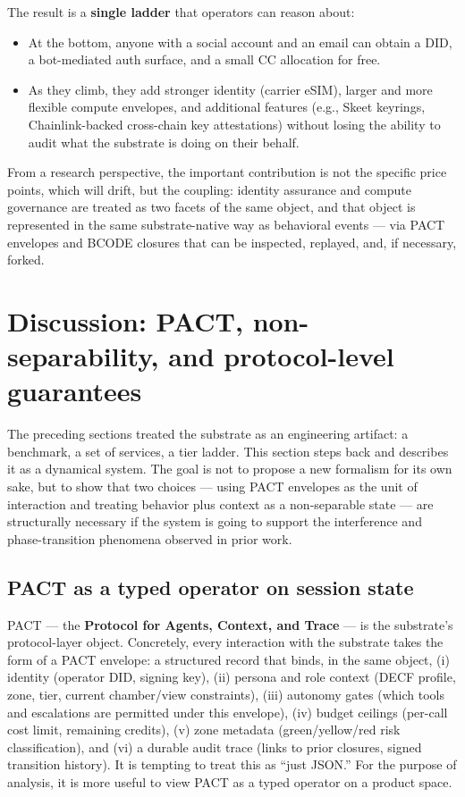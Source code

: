 \documentclass{article}
\providecommand{\tightlist}{\setlength{\itemsep}{0pt}\setlength{\parskip}{0pt}}
\begin{document}
The result is a \textbf{single ladder} that operators can reason about:

\begin{itemize}
\tightlist
\item
  At the bottom, anyone with a social account and an email can obtain a
  DID, a bot-mediated auth surface, and a small CC allocation for free.
\item
  As they climb, they add stronger identity (carrier eSIM), larger and
  more flexible compute envelopes, and additional features (e.g., Skeet
  keyrings, Chainlink-backed cross-chain key attestations) without
  losing the ability to audit what the substrate is doing on their
  behalf.
\end{itemize}

From a research perspective, the important contribution is not the
specific price points, which will drift, but the coupling: identity
assurance and compute governance are treated as two facets of the same
object, and that object is represented in the same substrate-native way
as behavioral events --- via PACT envelopes and BCODE closures that can
be inspected, replayed, and, if necessary, forked.

\section{Discussion: PACT, non-separability, and protocol-level
guarantees}\label{discussion-pact-non-separability-and-protocol-level-guarantees}

The preceding sections treated the substrate as an engineering artifact:
a benchmark, a set of services, a tier ladder. This section steps back
and describes it as a dynamical system. The goal is not to propose a new
formalism for its own sake, but to show that two choices --- using PACT
envelopes as the unit of interaction and treating behavior plus context
as a non-separable state --- are structurally necessary if the system is
going to support the interference and phase-transition phenomena
observed in prior work.

\subsection{PACT as a typed operator on session
state}\label{pact-as-a-typed-operator-on-session-state}

PACT --- the \textbf{Protocol for Agents, Context, and Trace} --- is the
substrate's protocol-layer object. Concretely, every interaction with
the substrate takes the form of a PACT envelope: a structured record
that binds, in the same object, (i) identity (operator DID, signing
key), (ii) persona and role context (DECF profile, zone, tier, current
chamber/view constraints), (iii) autonomy gates (which tools and
escalations are permitted under this envelope), (iv) budget ceilings
(per-call cost limit, remaining credits), (v) zone metadata
(green/yellow/red risk classification), and (vi) a durable audit trace
(links to prior closures, signed transition history). It is tempting to
treat this as ``just JSON.'' For the purpose of analysis, it is more
useful to view PACT as a typed operator on a product space.
\end{document}

